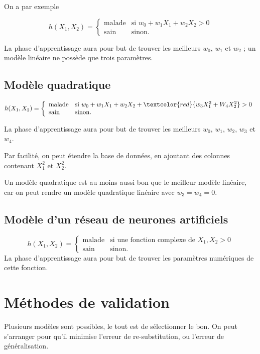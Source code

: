 
On a par exemple

$$h(X_1, X_2) = \left\{
\begin{array}{ll}
\text{malade} & \text{si } w_0 + w_1X_1 + w_2X_2 > 0 \\
\text{sain} & \text{sinon.}
\end{array}
\right.$$

La phase d'apprentissage aura pour but de trouver les meilleurs $w_0$, $w_1$ et $w_2$ ; un modèle linéaire ne possède que trois paramètres.

\subsection{Modèle quadratique}

$$h(X_1, X_2) = \left\{
\begin{array}{ll}
\text{malade} & \text{si } w_0 + w_1X_1 + w_2X_2 + \textcolor{red}{w_3 X_1^2 + W_4X_2^2} > 0 \\
\text{sain} & \text{sinon.}
\end{array}
\right.$$

La phase d'apprentissage aura pour but de trouver les meilleurs $w_0$, $w_1$, $w_2$, $w_3$ et $w_4$.

Par facilité, on peut étendre la base de données, en ajoutant des colonnes contenant $X_1^2$ et $X_2^2$.

Un modèle quadratique est au moins aussi bon que le meilleur modèle linéaire, car on peut rendre un modèle quadratique linéaire avec $w_3 = w_4 = 0$.


\subsection{Modèle d'un réseau de neurones artificiels}
$$h(X_1, X_2) = \left\{
\begin{array}{ll}
\text{malade} & \text{si une fonction complexe de } X_1, X_2 > 0 \\
\text{sain} & \text{sinon.}
\end{array}
\right.$$
La phase d'apprentissage aura pour but de trouver les paramètres numériques de cette fonction.

\section{Méthodes de validation}

Plusieurs modèles sont possibles, le tout est de sélectionner le bon. On peut s'arranger pour qu'il minimise l'erreur de re-substitution, ou l'erreur de généralisation.

